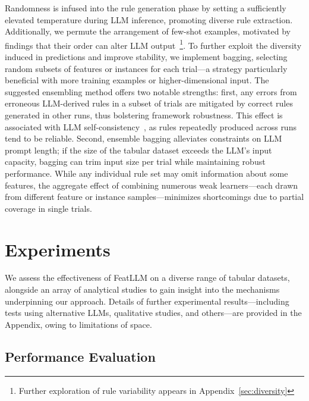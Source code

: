 Randomness is infused into the rule generation phase by setting a sufficiently elevated temperature during LLM inference, promoting diverse rule extraction. Additionally, we permute the arrangement of few-shot examples, motivated by findings that their order can alter LLM output~\cite{lu2022fantastically}\footnote{Further exploration of rule variability appears in Appendix~\ref{sec:diversity}}. To further exploit the diversity induced in predictions and improve stability, we implement bagging, selecting random subsets of features or instances for each trial—a strategy particularly beneficial with more training examples or higher-dimensional input. The suggested ensembling method offers two notable strengths: first, any errors from erroneous LLM-derived rules in a subset of trials are mitigated by correct rules generated in other runs, thus bolstering framework robustness. This effect is associated with LLM self-consistency~\cite{wang2022self}, as rules repeatedly produced across runs tend to be reliable. Second, ensemble bagging alleviates constraints on LLM prompt length; if the size of the tabular dataset exceeds the LLM’s input capacity, bagging can trim input size per trial while maintaining robust performance. While any individual rule set may omit information about some features, the aggregate effect of combining numerous weak learners—each drawn from different feature or instance samples—minimizes shortcomings due to partial coverage in single trials.

\section{Experiments}
We assess the effectiveness of \textsf{FeatLLM} on a diverse range of tabular datasets, alongside an array of analytical studies to gain insight into the mechanisms underpinning our approach. Details of further experimental results—including tests using alternative LLMs, qualitative studies, and others—are provided in the Appendix, owing to limitations of space.

\subsection{Performance Evaluation}
